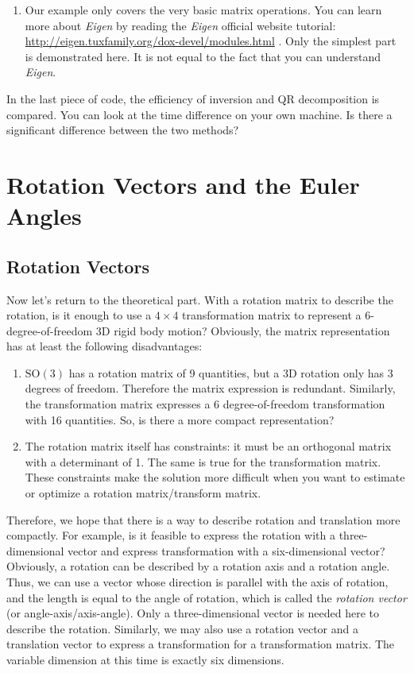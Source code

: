 \begin{enumerate}
    \item Our example only covers the very basic matrix operations. You can learn more about \textit{Eigen} by reading the \textit{Eigen} official website tutorial: \\ { \url{http://eigen.tuxfamily.org/dox-devel/modules.html} }. Only the simplest part is demonstrated here. It is not equal to the fact that you can understand \textit{Eigen}.
\end{enumerate}

In the last piece of code, the efficiency of inversion and QR decomposition is compared. You can look at the time difference on your own machine. Is there a significant difference between the two methods?

\section{Rotation Vectors and the Euler Angles}
\subsection{Rotation Vectors}
Now let's return to the theoretical part. With a rotation matrix to describe the rotation, is it enough to use a $4 \times 4$ transformation matrix to represent a 6-degree-of-freedom 3D rigid body motion? Obviously, the matrix representation has at least the following disadvantages:
\begin{enumerate}
    \item  $\mathrm{SO}( 3 ) $ has a rotation matrix of 9 quantities, but a 3D rotation only has 3 degrees of freedom. Therefore the matrix expression is redundant. Similarly, the transformation matrix expresses a 6 degree-of-freedom transformation with 16 quantities. So, is there a more compact representation?
    \item The rotation matrix itself has constraints: it must be an orthogonal matrix with a determinant of 1. The same is true for the transformation matrix. These constraints make the solution more difficult when you want to estimate or optimize a rotation matrix/transform matrix.
\end{enumerate}

Therefore, we hope that there is a way to describe rotation and translation more compactly. For example, is it feasible to express the rotation with a three-dimensional vector and express transformation with a six-dimensional vector? Obviously, a rotation can be described by a rotation axis and a rotation angle. Thus, we can use a vector whose direction is parallel with the axis of rotation, and the length is equal to the angle of rotation, which is called the \textit{rotation vector} (or angle-axis/axis-angle). Only a three-dimensional vector is needed here to describe the rotation. Similarly, we may also use a rotation vector and a translation vector to express a transformation for a transformation matrix. The variable dimension at this time is exactly six dimensions.

